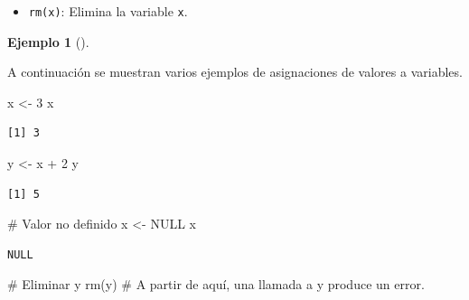 \documentclass[
  a4paper,
]{scrreport}
\newenvironment{Shaded}{\begin{snugshade}}{\end{snugshade}}
\newcommand{\CommentTok}[1]{\textcolor[rgb]{0.37,0.37,0.37}{#1}}
\newcommand{\ConstantTok}[1]{\textcolor[rgb]{0.56,0.35,0.01}{#1}}
\newcommand{\DecValTok}[1]{\textcolor[rgb]{0.68,0.00,0.00}{#1}}
\newcommand{\FunctionTok}[1]{\textcolor[rgb]{0.28,0.35,0.67}{#1}}
\newcommand{\NormalTok}[1]{\textcolor[rgb]{0.00,0.23,0.31}{#1}}
\newcommand{\OtherTok}[1]{\textcolor[rgb]{0.00,0.23,0.31}{#1}}
\newcommand{\SpecialCharTok}[1]{\textcolor[rgb]{0.37,0.37,0.37}{#1}}
\providecommand{\tightlist}{%
  \setlength{\itemsep}{0pt}\setlength{\parskip}{0pt}}\usepackage{longtable,booktabs,array}
\theoremstyle{definition}
\theoremstyle{definition}
\newtheorem{example}{Ejemplo}[chapter]
\theoremstyle{remark}
\begin{document}
\begin{itemize}
\tightlist
\item
  \texttt{rm(x)}: Elimina la variable \texttt{x}.
\end{itemize}

\leavevmode{}%
\begin{example}[]\label{exm-variables}

A continuación se muestran varios ejemplos de asignaciones de valores a
variables.

\begin{Shaded}
\begin{Highlighting}[]
\NormalTok{x }\OtherTok{\textless{}{-}} \DecValTok{3}
\NormalTok{x}
\end{Highlighting}
\end{Shaded}

\begin{verbatim}
[1] 3
\end{verbatim}

\begin{Shaded}
\begin{Highlighting}[]
\NormalTok{y }\OtherTok{\textless{}{-}}\NormalTok{ x }\SpecialCharTok{+} \DecValTok{2}
\NormalTok{y}
\end{Highlighting}
\end{Shaded}

\begin{verbatim}
[1] 5
\end{verbatim}

\begin{Shaded}
\begin{Highlighting}[]
\CommentTok{\# Valor no definido}
\NormalTok{x }\OtherTok{\textless{}{-}} \ConstantTok{NULL}
\NormalTok{x}
\end{Highlighting}
\end{Shaded}

\begin{verbatim}
NULL
\end{verbatim}

\begin{Shaded}
\begin{Highlighting}[]
\CommentTok{\# Eliminar y}
\FunctionTok{rm}\NormalTok{(y)}
\CommentTok{\# A partir de aquí, una llamada a y produce un error.}
\end{Highlighting}
\end{Shaded}

\end{example}
\end{document}
